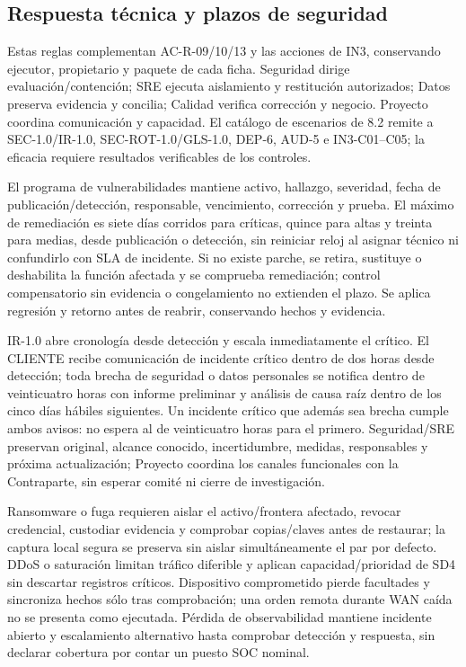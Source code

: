 \subsection{Respuesta técnica y plazos de seguridad}\label{sec:sd8-respuesta-seguridad}
Estas reglas complementan AC-R-09/10/13 y las acciones de IN3, conservando ejecutor, propietario y paquete de cada ficha. Seguridad dirige evaluación/contención; SRE ejecuta aislamiento y restitución autorizados; Datos preserva evidencia y concilia; Calidad verifica corrección y negocio. Proyecto coordina comunicación y capacidad. El catálogo de escenarios de 8.2 remite a SEC-1.0/IR-1.0, SEC-ROT-1.0/GLS-1.0, DEP-6, AUD-5 e IN3-C01--C05; la eficacia requiere resultados verificables de los controles.

El programa de vulnerabilidades mantiene activo, hallazgo, severidad, fecha de publicación/detección, responsable, vencimiento, corrección y prueba. El máximo de remediación es siete días corridos para críticas, quince para altas y treinta para medias, desde publicación o detección, sin reiniciar reloj al asignar técnico ni confundirlo con SLA de incidente. Si no existe parche, se retira, sustituye o deshabilita la función afectada y se comprueba remediación; control compensatorio sin evidencia o congelamiento no extienden el plazo. Se aplica regresión y retorno antes de reabrir, conservando hechos y evidencia. \parencites[art.~21.1; p.~15]{sd8-ba}[RT-11.04; p.~23]{sd8-bt}

IR-1.0 abre cronología desde detección y escala inmediatamente el crítico. El CLIENTE recibe comunicación de incidente crítico dentro de dos horas desde detección; toda brecha de seguridad o datos personales se notifica dentro de veinticuatro horas con informe preliminar y análisis de causa raíz dentro de los cinco días hábiles siguientes. Un incidente crítico que además sea brecha cumple ambos avisos: no espera al de veinticuatro horas para el primero. Seguridad/SRE preservan original, alcance conocido, incertidumbre, medidas, responsables y próxima actualización; Proyecto coordina los canales funcionales con la Contraparte, sin esperar comité ni cierre de investigación. \parencites[art.~21.3; pp.~15--16]{sd8-ba}[RT-11.18/19; p.~24]{sd8-bt}

Ransomware o fuga requieren aislar el activo/frontera afectado, revocar credencial, custodiar evidencia y comprobar copias/claves antes de restaurar; la captura local segura se preserva sin aislar simultáneamente el par por defecto. DDoS o saturación limitan tráfico diferible y aplican capacidad/prioridad de SD4 sin descartar registros críticos. Dispositivo comprometido pierde facultades y sincroniza hechos sólo tras comprobación; una orden remota durante WAN caída no se presenta como ejecutada. Pérdida de observabilidad mantiene incidente abierto y escalamiento alternativo hasta comprobar detección y respuesta, sin declarar cobertura por contar un puesto SOC nominal.

